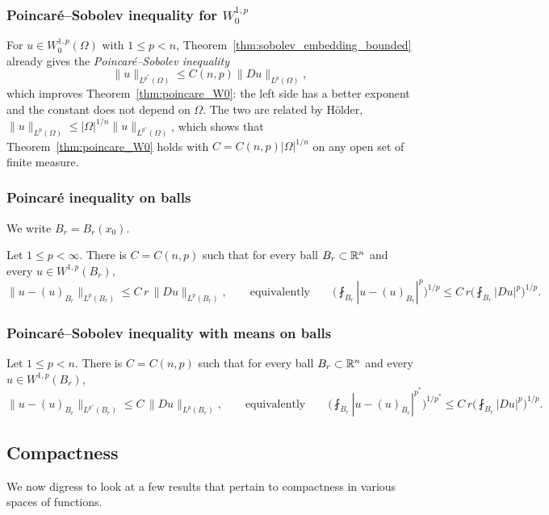 \subsubsection{Poincar\'e--Sobolev inequality for $W^{1,p}_0$}
For $u\in W_0^{1,p}(\Omega)$ with $1\leq p<n$, Theorem~\ref{thm:sobolev_embedding_bounded} already gives the \emph{Poincar\'e--Sobolev inequality}
$$\|u\|_{L^{p^*}(\Omega)}\leq C(n,p)\|Du\|_{L^p(\Omega)},$$
which improves Theorem~\ref{thm:poincare_W0}: the left side has a better exponent and the constant does not depend on $\Omega$. The two are related by H\"older, $\|u\|_{L^p(\Omega)}\leq|\Omega|^{1/n}\|u\|_{L^{p^*}(\Omega)}$, which shows that Theorem~\ref{thm:poincare_W0} holds with $C=C(n,p)|\Omega|^{1/n}$ on any open set of finite measure.

\subsubsection{Poincar\'e inequality on balls}
We write $B_r=B_r(x_0)$. 

\begin{theorem}\label{thm:poincare_ball_mean}
Let $1\leq p<\infty$. There is $C=C(n,p)$ such that for every ball $B_r\subset\mathbb{R}^n$ and every $u\in W^{1,p}(B_r)$,
$$\|u-(u)_{B_r}\|_{L^p(B_r)}\leq C\,r\,\|Du\|_{L^p(B_r)},\qquad\text{equivalently}\qquad\Big(\fint_{B_r}|u-(u)_{B_r}|^p\Big)^{1/p}\leq C\,r\Big(\fint_{B_r}|Du|^p\Big)^{1/p}.$$
\end{theorem}

\subsubsection{Poincar\'e--Sobolev inequality with means on balls}
\begin{theorem}\label{thm:poincare_sobolev_ball}
Let $1\leq p<n$. There is $C=C(n,p)$ such that for every ball $B_r\subset\mathbb{R}^n$ and every $u\in W^{1,p}(B_r)$,
$$\|u-(u)_{B_r}\|_{L^{p^*}(B_r)}\leq C\,\|Du\|_{L^p(B_r)},\qquad\text{equivalently}\qquad\Big(\fint_{B_r}|u-(u)_{B_r}|^{p^*}\Big)^{1/p^*}\leq C\,r\Big(\fint_{B_r}|Du|^p\Big)^{1/p}.$$
\end{theorem}

\subsection{Compactness}
We now digress to look at a few results that pertain to compactness in various spaces of functions. 

